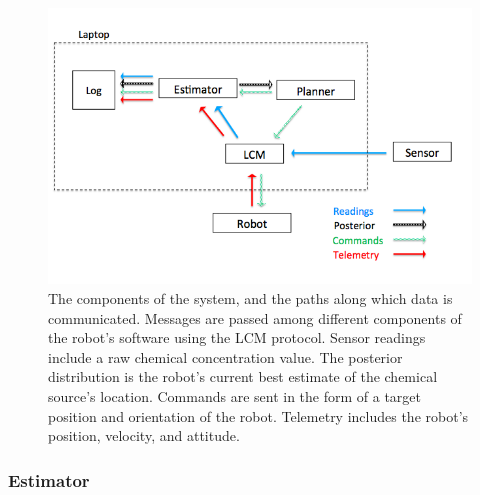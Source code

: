 \documentclass[submit, 12pt]{aiaa-pretty-modified}
\begin{document}
\begin{figure}
\begin{center}
\includegraphics[width=6in]{img/acquisition.pdf}
\caption[Data acquisition flowchart]{The components of the system, and the paths along which data is
  communicated. Messages are passed among different components of the robot's
  software using the LCM protocol.  Sensor readings include a raw
  chemical concentration value.  The
  posterior distribution is the robot's current best estimate of the chemical
  source's location. Commands are sent in the form of a target position and
  orientation of the robot. Telemetry includes the robot's position, velocity,
  and attitude.}
\label{fig:acquisition}
\end{center}
\end{figure}

\subsubsection{Estimator}
\end{document}
